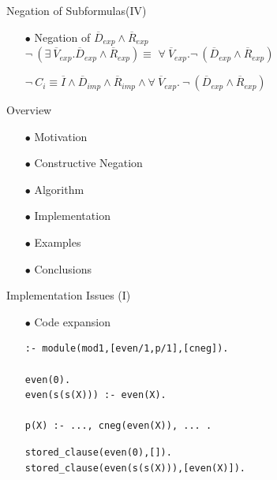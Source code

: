 \documentclass[pdf,slideColor,contemporain]{prosper}
\begin{document}
\begin{slide}{Negation of Subformulas(IV)}
     \begin{itemize}
        \item[{\blue$\bullet$}] Negation of $\overline{D}_{exp} \wedge
           \overline{R}_{exp}$ \\
\vspace{1cm}
$ \neg~ (\exists~ \overline{V}_{exp}.
           \overline{D}_{exp} \wedge \overline{R}_{exp} ) \equiv $
$\forall~ \overline{V}_{exp}. \neg ~(\overline{D}_{exp}
           \wedge \overline{R}_{exp})$\\

\vspace{1.1cm}
{\blue
           $ \neg ~ C_i  \equiv \overline{I} \wedge \overline{D}_{imp}
           \wedge \overline{R}_{imp} \wedge \forall~
           \overline{V}_{exp}.~ \neg~(\overline{D}_{exp} \wedge
           \overline{R}_{exp})$

}
     \end{itemize}
\end{slide}

\begin{slide}{Overview}
\vspace{0.8cm}
        \begin{itemize}
                \item[{\blue $\bullet$}] Motivation
                \item[{\blue $\bullet$}] Constructive Negation
                \item[{\blue $\bullet$}] Algorithm
                \item[$\bullet$] {\blue Implementation}
                \item[{\blue $\bullet$}] Examples
                \item[{\blue $\bullet$}] Conclusions
        \end{itemize}
\end{slide}


\begin{slide}{Implementation Issues (I)}
     \begin{itemize}
        \item[$\bullet$] {\blue Code expansion}
\begin{small}
\begin{verbatim}
:- module(mod1,[even/1,p/1],[cneg]).

even(0).
even(s(s(X))) :- even(X).

p(X) :- ..., cneg(even(X)), ... .
\end{verbatim}
{\blue
\begin{verbatim}
stored_clause(even(0),[]).
stored_clause(even(s(s(X))),[even(X)]).

\end{verbatim}}
\end{small}
     \end{itemize}
\end{slide}
\end{document}
